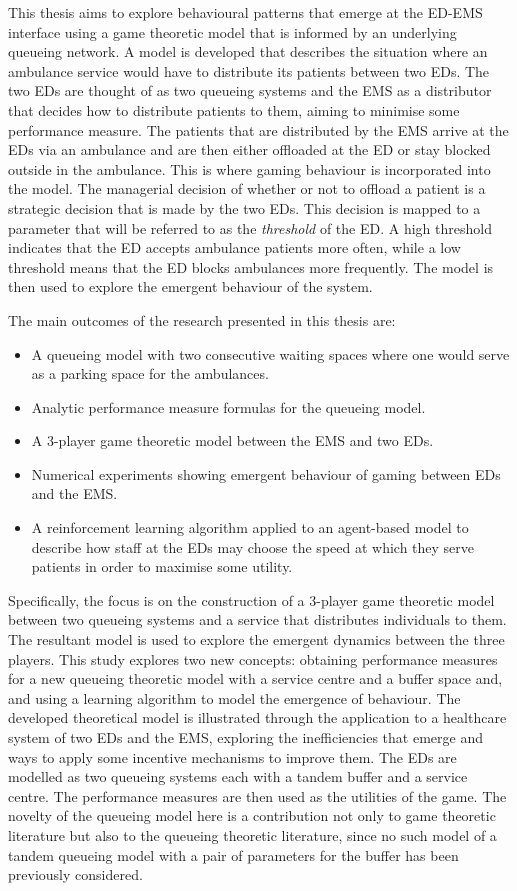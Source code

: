 This thesis aims to explore behavioural patterns that emerge at the ED-EMS
interface using a game theoretic model that is informed by an underlying
queueing network.
A model is developed that describes the situation where an ambulance service
would have to distribute its patients between two EDs.
The two EDs are thought of as two queueing systems and the EMS as a distributor
that decides how to distribute patients to them, aiming to minimise some
performance measure.
The patients that are distributed by the EMS arrive at the EDs via an ambulance
and are then either offloaded at the ED or stay blocked outside in the
ambulance.
This is where gaming behaviour is incorporated into the model.
The managerial decision of whether or not to offload a patient is a strategic
decision that is made by the two EDs.
This decision is mapped to a parameter that will be referred to as the
\textit{threshold} of the ED.
A high threshold indicates that the ED accepts ambulance patients more often,
while a low threshold means that the ED blocks ambulances more frequently.
The model is then used to explore the emergent behaviour of the system.

The main outcomes of the research presented in this thesis are:
\begin{itemize}
    \item A queueing model with two consecutive waiting spaces where one would
    serve as a parking space for the ambulances.
    \item Analytic performance measure formulas for the queueing model.
    \item A 3-player game theoretic model between the EMS and two EDs.
    \item Numerical experiments showing emergent behaviour of gaming between
    EDs and the EMS.
    \item A reinforcement learning algorithm applied to an agent-based model to
    describe how staff at the EDs may choose the speed at which they serve
    patients in order to maximise some utility.
\end{itemize}

Specifically, the focus is on the construction of a 3-player game theoretic
model between two queueing systems and a service that distributes individuals
to them.
The resultant model is used to explore the emergent dynamics between the three
players.
This study explores two new concepts: obtaining performance measures for a new
queueing theoretic model with a service centre and a buffer space and, and
using a learning algorithm to model the emergence of behaviour.
The developed theoretical model is illustrated through the application to
a healthcare system of two EDs and the EMS, exploring the inefficiencies that
emerge and ways to apply some incentive mechanisms to improve them.
The EDs are modelled as two queueing systems each with a tandem buffer and a
service centre.
The performance measures are then used as the utilities of the game.
The novelty of the queueing model here is a contribution not only to game
theoretic literature but also to the queueing theoretic literature, since
no such model of a tandem queueing model with a pair of parameters for the
buffer has been previously considered.

